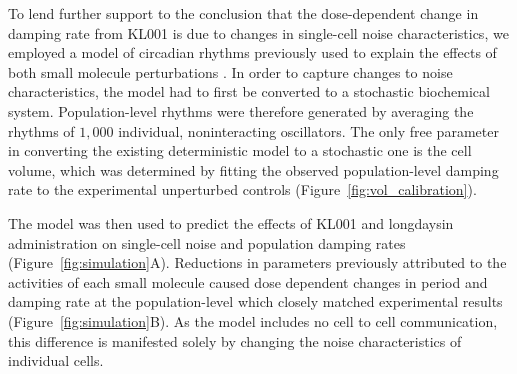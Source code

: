 \documentclass[11pt, letterpaper]{article}
\begin{document}

To lend further support to the conclusion that the dose-dependent change in damping rate from KL001 is due to changes in single-cell noise characteristics, we employed a model of circadian rhythms previously used to explain the effects of both small molecule perturbations \cite{St.John2014}.
In order to capture changes to noise characteristics, the model had to first be converted to a stochastic biochemical system.
Population-level rhythms were therefore generated by averaging the rhythms of $1,000$ individual, noninteracting oscillators.
The only free parameter in converting the existing deterministic model to a stochastic one is the cell volume, which was determined by fitting the observed population-level damping rate to the experimental unperturbed controls (Figure~\ref{fig:vol_calibration}).

The model was then used to predict the effects of KL001 and longdaysin administration on single-cell noise and population damping rates (Figure~\ref{fig:simulation}A).
Reductions in parameters previously attributed to the activities of each small molecule caused dose dependent changes in period and damping rate at the population-level which closely matched experimental results (Figure~\ref{fig:simulation}B).
As the model includes no cell to cell communication, this difference is manifested solely by changing the noise characteristics of individual cells.
\end{document}
